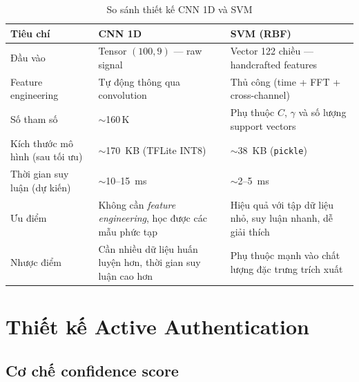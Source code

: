 \documentclass[../DoAn.tex]{subfiles}
\begin{document}
    \begin{table}[H]
    \centering
    \caption{So sánh thiết kế CNN 1D và SVM}
    \label{tab:cnn_vs_svm}
    \renewcommand{\arraystretch}{1.3}
    
    \begin{tabular}{|p{4cm}|p{5cm}|p{5cm}|}
    \hline
    \textbf{Tiêu chí} & \textbf{CNN 1D} & \textbf{SVM (RBF)} \\
    \hline
    
    Đầu vào 
    & Tensor $(100, 9)$ --- raw signal 
    & Vector 122 chiều --- handcrafted features \\
    \hline
    
    Feature engineering 
    & Tự động thông qua convolution 
    & Thủ công (time + FFT + cross-channel) \\
    \hline
    
    Số tham số 
    & $\sim$160\,K 
    & Phụ thuộc $C$, $\gamma$ và số lượng support vectors \\
    \hline
    
    Kích thước mô hình (sau tối ưu) 
    & $\sim$170~KB (TFLite INT8) 
    & $\sim$38~KB (\texttt{pickle}) \\
    \hline
    
    Thời gian suy luận (dự kiến) 
    & $\sim$10--15~ms 
    & $\sim$2--5~ms \\
    \hline
    
    Ưu điểm 
    & Không cần \textit{feature engineering}, học được các mẫu phức tạp 
    & Hiệu quả với tập dữ liệu nhỏ, suy luận nhanh, dễ giải thích \\
    \hline
    
    Nhược điểm 
    & Cần nhiều dữ liệu huấn luyện hơn, thời gian suy luận cao hơn 
    & Phụ thuộc mạnh vào chất lượng đặc trưng trích xuất \\
    \hline
    
    \end{tabular}
    \end{table}

    \section{Thiết kế Active Authentication}

    \subsection{Cơ chế confidence score}
\end{document}
